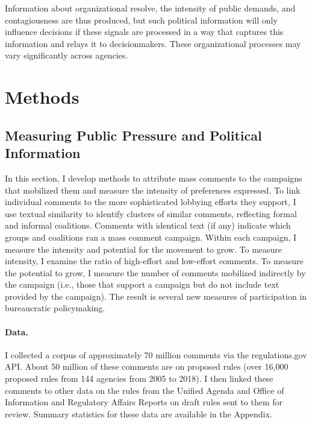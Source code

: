 \documentclass[
      12pt,
        ]{article}
\begin{document}
Information about organizational resolve, the intensity of public
demands, and contagiousness are thus produced, but such political
information will only influence decisions if these signals are processed
in a way that captures this information and relays it to decisionmakers.
These organizational processes may vary significantly across agencies.

\hypertarget{whyMail-methods}{%
\section{Methods}\label{whyMail-methods}}

\hypertarget{measuring-public-pressure-and-political-information}{%
\subsection{Measuring Public Pressure and Political Information}\label{measuring-public-pressure-and-political-information}}

In this section, I develop methods to attribute mass comments to the
campaigns that mobilized them and measure the intensity of preferences
expressed. To link individual comments to the more sophisticated
lobbying efforts they support, I use textual similarity to identify
clusters of similar comments, reflecting formal and informal coalitions.
Comments with identical text (if any) indicate which groups and
coalitions ran a mass comment campaign. Within each campaign, I measure
the intensity and potential for the movement to grow. To measure
intensity, I examine the ratio of high-effort and low-effort comments.
To measure the potential to grow, I measure the number of comments mobilized
indirectly by the campaign (i.e., those that support a campaign but do
not include text provided by the campaign). The result is several new
measures of participation in bureaucratic policymaking.

\hypertarget{data.}{%
\paragraph{Data.}\label{data.}}

I collected a corpus of approximately 70 million comments via the
regulations.gov API. About 50 million of these comments are on proposed
rules (over 16,000 proposed rules from 144 agencies from 2005 to 2018).
I then linked these comments to other data on the rules from the Unified
Agenda and Office of Information and Regulatory Affairs Reports on draft
rules sent to them for review. Summary statistics for these data are
available in the Appendix.
\end{document}
